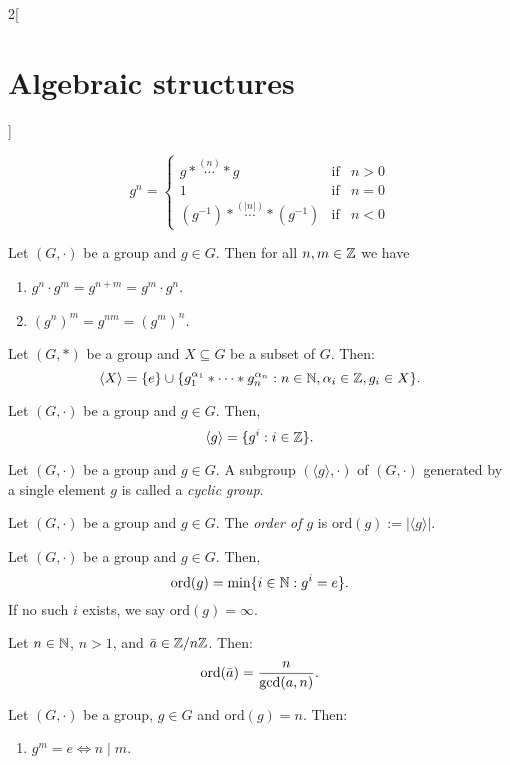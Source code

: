 \documentclass[../../../main.tex]{subfiles}
\begin{document}
\begin{multicols}{2}[\section{Algebraic structures}]
\begin{definition}
    $$g^n=\left\{
    \begin{array}{lll}
        g*\overset{(n)}{\cdots}* g & \text{if} & n>0  \\
        1 & \text{if} & n=0  \\
        (g^{-1})*\overset{(|n|)}{\cdots}*(g^{-1}) & \text{if} & n<0 
    \end{array}\right.$$
\end{definition}
\begin{lemma}
    Let $(G,\cdot)$ be a group and $g\in G$. Then for all $n,m\in\mathbb{Z} $ we have
    \begin{enumerate}
        \item $g^n\cdot g^m=g^{n+m}=g^m\cdot g^n$.
        \item $(g^n)^m=g^{nm}=(g^m)^n$.
    \end{enumerate}
\end{lemma}
\begin{prop}
    Let $(G,*)$ be a group and $X\subseteq G$ be a subset of $G$. Then: $$\langle X\rangle=\{e\}\cup\{g_1^{\alpha_1}*\cdots* g_n^{\alpha_n}:n\in\mathbb{N} ,\alpha_i\in\mathbb{Z} ,g_i\in X\}.$$
\end{prop}
\begin{corollary}
    Let $(G,\cdot)$ be a group and $g\in G$. Then, $$\langle g\rangle=\{g^i:i\in\mathbb{Z} \}.$$
\end{corollary}
\begin{definition}
    Let $(G,\cdot)$ be a group and $g\in G$. A subgroup $(\langle g\rangle,\cdot)$ of $(G,\cdot)$ generated by a single element $g$ is called a \textit{cyclic group}.
\end{definition}
\begin{definition}
    Let $(G,\cdot)$ be a group and $g\in G$. The \textit{order of $g$} is $\text{ord}(g):=|\langle g\rangle|$.
\end{definition}
\begin{prop}
    Let $(G,\cdot)$ be a group and $g\in G$. Then, $$\text{ord}(g)=\min\{i\in\mathbb{N} :g^i=e\}.$$ If no such $i$ exists, we say $\text{ord}(g)=\infty$.
\end{prop}
\begin{corollary}
    Let $n\in\mathbb{N} $, $n>1$, and $\Bar{a}\in\mathbb{Z} /n\mathbb{Z} $. Then: $$\text{ord}(\Bar{a})=\frac{n}{\gcd(a,n)}.$$
\end{corollary}
\begin{lemma}
    Let $(G,\cdot)$ be a group, $g\in G$ and $\text{ord}(g)=n$. Then:
    \begin{enumerate}
        \item $g^m=e\iff n\mid m$.

\end{enumerate}
\end{lemma}
\end{multicols}
\end{document}
